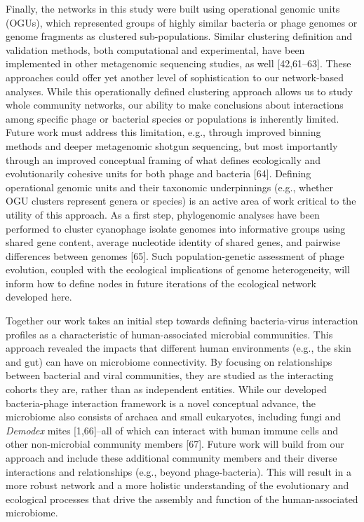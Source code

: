 \documentclass[12pt,]{article}
\begin{document}
Finally, the networks in this study were built using operational genomic
units (OGUs), which represented groups of highly similar bacteria or
phage genomes or genome fragments as clustered sub-populations. Similar
clustering definition and validation methods, both computational and
experimental, have been implemented in other metagenomic sequencing
studies, as well {[}42,61--63{]}. These approaches could offer yet
another level of sophistication to our network-based analyses. While
this operationally defined clustering approach allows us to study whole
community networks, our ability to make conclusions about interactions
among specific phage or bacterial species or populations is inherently
limited. Future work must address this limitation, e.g., through
improved binning methods and deeper metagenomic shotgun sequencing, but
most importantly through an improved conceptual framing of what defines
ecologically and evolutionarily cohesive units for both phage and
bacteria {[}64{]}. Defining operational genomic units and their
taxonomic underpinnings (e.g., whether OGU clusters represent genera or
species) is an active area of work critical to the utility of this
approach. As a first step, phylogenomic analyses have been performed to
cluster cyanophage isolate genomes into informative groups using shared
gene content, average nucleotide identity of shared genes, and pairwise
differences between genomes {[}65{]}. Such population-genetic assessment
of phage evolution, coupled with the ecological implications of genome
heterogeneity, will inform how to define nodes in future iterations of
the ecological network developed here.

Together our work takes an initial step towards defining bacteria-virus
interaction profiles as a characteristic of human-associated microbial
communities. This approach revealed the impacts that different human
environments (e.g., the skin and gut) can have on microbiome
connectivity. By focusing on relationships between bacterial and viral
communities, they are studied as the interacting cohorts they are,
rather than as independent entities. While our developed bacteria-phage
interaction framework is a novel conceptual advance, the microbiome also
consists of archaea and small eukaryotes, including fungi and
\emph{Demodex} mites {[}1,66{]}--all of which can interact with human
immune cells and other non-microbial community members {[}67{]}. Future
work will build from our approach and include these additional community
members and their diverse interactions and relationships (e.g., beyond
phage-bacteria). This will result in a more robust network and a more
holistic understanding of the evolutionary and ecological processes that
drive the assembly and function of the human-associated microbiome.
\end{document}
